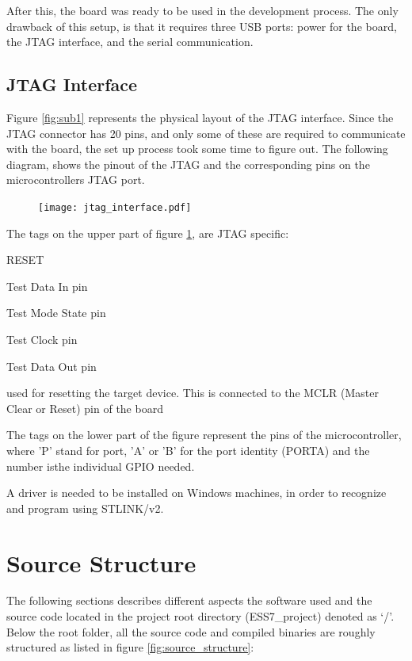 After this, the board was ready to be used in the development process.
The only drawback of this setup, is that it requires three USB ports:
power for the board, the JTAG interface, and the serial communication.

\subsection{JTAG Interface}
\label{ssec:JTAG_Interface}
Figure \ref{fig:sub1} represents the physical layout of the JTAG interface.
Since the JTAG connector has 20 pins, and only some of these are required
to communicate with the board, the set up process took some time to figure
out. The following diagram, shows the pinout of the JTAG and the 
corresponding pins on the microcontroller\textquotesingle s JTAG port.

\begin{figure}[H]
\centering
\texttt{[image: jtag\_interface.pdf]}
\label{fig:jtag_interface}
\end{figure}

The tags on the upper part of figure \ref{fig:jtag_interface}, are
JTAG specific:
\begin{labeling}{RESET}
	\item [\textbf{TDI}]
		Test Data In pin
	\item [\textbf{TMS}]
		Test Mode State pin
	\item [\textbf{TCK}]
		Test Clock pin
	\item [\textbf{TDO}]
		Test Data Out pin
	\item [\textbf{RESET}]
		used for resetting the target device. This is connected to the 
		MCLR (Master Clear or Reset) pin of the board
\end{labeling}

The tags on the lower part of the figure represent the pins of the 
microcontroller, where 'P' stand for port, 'A' or 'B' for the port
identity (PORTA) and the number isthe individual GPIO needed.

A driver is needed to be installed on Windows machines, in order to
recognize and program using STLINK/v2.


\section{Source Structure}
The following sections describes different aspects the software used and
the source code located in the project root directory (ESS7\_project) denoted as `/'.
Below the root folder,
all the source code and compiled binaries are roughly structured as listed
in figure \ref{fig:source_structure}:

